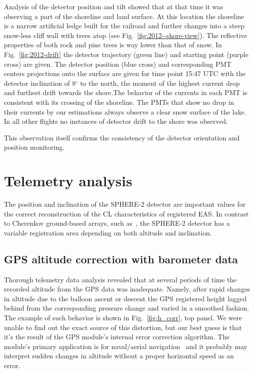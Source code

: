 \documentclass[universe,article,submit,moreauthors,pdftex]{Definitions/mdpi}
\begin{document}
Analysis of the detector position and tilt showed that at that time it was observing a part of the shoreline and land surface. At this location the shoreline is a narrow artificial ledge built for the railroad and further changes into a steep snow-less cliff wall with trees atop (see Fig.~\ref{fig:2012--shore-view}). The reflective properties of both rock and pine trees is way lower than that of snow. In Fig.~\ref{fig:2012-drift} the detector trajectory (green line) and starting point (purple cross) are given. The detector position (blue cross) and corresponding PMT centers projections onto the surface are given for time point 15:47 UTC with the detector inclination of 8$^\circ$ to the north, the moment of the highest current drop and furthest drift towards the shore.The behavior of the currents in each PMT is consistent with its crossing of the shoreline. The PMTs that show no drop in their currents by our estimations always observe a clear snow surface of the lake. In all other flights no instances of detector drift to the shore was observed. 

This observation itself confirms the consistency of the detector orientation and position monitoring.

\section{Telemetry analysis}

The position and inclination of the SPHERE-2 detector are important values for the correct reconstruction of the CL characteristics of registered EAS. In contrast to Cherenkov ground-based arrays, such as~\cite{Yakutsk19,TUNKA133}, the SPHERE-2 detector has a variable registration area depending on both altitude and inclination.

\subsection{GPS altitude correction with barometer data}
\label{sect:gps_correction}

Thorough telemetry data analysis revealed that at several periods of time the recorded altitude from the GPS data was inadequate. Namely, after rapid changes in altitude due to the balloon ascent or descent the GPS registered height lagged behind from the corresponding pressure change and varied in a smoothed fashion. The example of such behavior is shown in Fig.~\ref{fig:h_corr}, top panel. We were unable to find out the exact source of this distortion, but our best guess is that it's the result of the GPS module's internal error correction algorithm. The module's primary application is for naval/aerial navigation~\cite{GPS-module-specs} and it probably may interpret sudden changes in altitude without a proper horizontal speed as an error.
\end{document}
